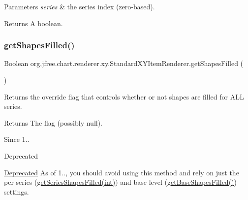 \begin{DoxyParams}{Parameters}
{\em series} & the series index (zero-\/based).\\
\hline
\end{DoxyParams}
\begin{DoxyReturn}{Returns}
A boolean. 
\end{DoxyReturn}
\mbox{\label{classorg_1_1jfree_1_1chart_1_1renderer_1_1xy_1_1_standard_x_y_item_renderer_acf250632e448f82dad856f22401abd12}} 
\subsubsection{\texorpdfstring{get\+Shapes\+Filled()}{getShapesFilled()}}
{\footnotesize\ttfamily Boolean org.\+jfree.\+chart.\+renderer.\+xy.\+Standard\+X\+Y\+Item\+Renderer.\+get\+Shapes\+Filled (\begin{DoxyParamCaption}{ }\end{DoxyParamCaption})}

Returns the override flag that controls whether or not shapes are filled for A\+LL series.

\begin{DoxyReturn}{Returns}
The flag (possibly {\ttfamily null}).
\end{DoxyReturn}
\begin{DoxySince}{Since}
1..
\end{DoxySince}
\begin{DoxyRefDesc}{Deprecated}
\item[\mbox{\hyperlink{deprecated__deprecated000209}{Deprecated}}]As of 1.., you should avoid using this method and rely on just the per-\/series (\mbox{\hyperlink{classorg_1_1jfree_1_1chart_1_1renderer_1_1xy_1_1_standard_x_y_item_renderer_ae5cd12f33b9d935c2536456218d71dcb}{get\+Series\+Shapes\+Filled(int)}}) and base-\/level (\mbox{\hyperlink{classorg_1_1jfree_1_1chart_1_1renderer_1_1xy_1_1_standard_x_y_item_renderer_adb39a465a8e460f4accac823465c4ab5}{get\+Base\+Shapes\+Filled()}}) settings. \end{DoxyRefDesc}
\mbox{\label{classorg_1_1jfree_1_1chart_1_1renderer_1_1xy_1_1_standard_x_y_item_renderer_a75a53905e19f2319e692b08b43665e30}} 
